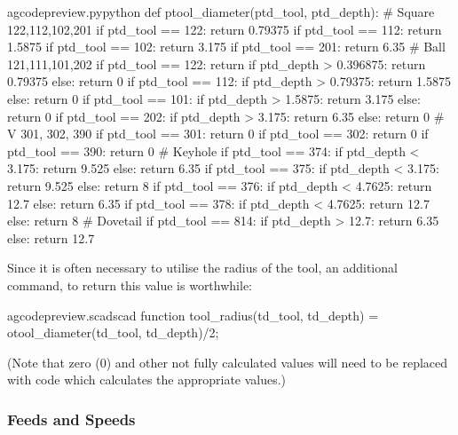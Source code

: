 \documentclass{ltxdoc}
\begin{document}
\lstset{firstnumber=\thegcpy}
\begin{writecode}{a}{gcodepreview.py}{python}
def ptool_diameter(ptd_tool, ptd_depth):
# Square 122,112,102,201
    if ptd_tool == 122:
        return 0.79375
    if ptd_tool == 112:
        return 1.5875
    if ptd_tool == 102:
        return 3.175
    if ptd_tool == 201:
        return 6.35
# Ball 121,111,101,202
    if ptd_tool == 122:
        return 
        if ptd_depth > 0.396875:
            return 0.79375
        else:
            return 0
    if ptd_tool == 112:
        if ptd_depth > 0.79375:
            return 1.5875
        else:
            return 0
    if ptd_tool == 101:
        if ptd_depth > 1.5875:
            return 3.175
        else:
            return 0
    if ptd_tool == 202:
        if ptd_depth > 3.175:
            return 6.35
        else:
            return 0
# V 301, 302, 390
    if ptd_tool == 301:
        return 0
    if ptd_tool == 302:
        return 0
    if ptd_tool == 390:
        return 0
# Keyhole
    if ptd_tool == 374:
        if ptd_depth < 3.175:
            return 9.525
        else:
            return 6.35
    if ptd_tool == 375:
        if ptd_depth < 3.175:
            return 9.525
        else:
            return 8
    if ptd_tool == 376:
        if ptd_depth < 4.7625:
            return 12.7
        else:
            return 6.35
    if ptd_tool == 378:
        if ptd_depth < 4.7625:
            return 12.7
        else:
            return 8
# Dovetail
    if ptd_tool == 814:
        if ptd_depth > 12.7:
            return 6.35
        else:
            return 12.7

\end{writecode}
\addtocounter{gcpy}{32}

Since it is often necessary to utilise the radius of the tool, an additional command,
 to return this value is worthwhile:
 
\lstset{firstnumber=\thegcpscad}
\begin{writecode}{a}{gcodepreview.scad}{scad}
function tool_radius(td_tool, td_depth) = otool_diameter(td_tool, td_depth)/2;

\end{writecode}
\addtocounter{gcpscad}{2}
 
(Note that zero (0) and other not fully calculated values will need to be replaced 
with code which calculates the appropriate values.)

\subsubsection{Feeds and Speeds}
\end{document}
